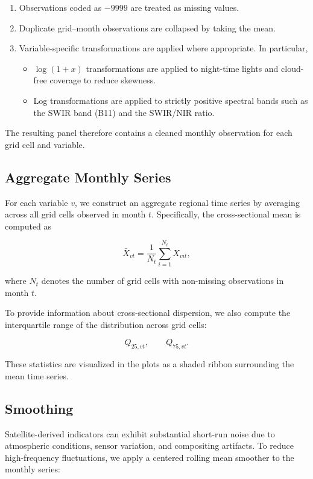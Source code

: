\documentclass[12pt]{article}
\begin{document}
\begin{enumerate}
    \item Observations coded as $-9999$ are treated as missing values.
    \item Duplicate grid--month observations are collapsed by taking the mean.
    \item Variable-specific transformations are applied where appropriate. In particular,
    \begin{itemize}
        \item $\log(1 + x)$ transformations are applied to night-time lights and cloud-free coverage to reduce skewness.
        \item Log transformations are applied to strictly positive spectral bands such as the SWIR band (B11) and the SWIR/NIR ratio.
    \end{itemize}
\end{enumerate}

The resulting panel therefore contains a cleaned monthly observation for each grid cell and variable.

\subsection{Aggregate Monthly Series}

For each variable $v$, we construct an aggregate regional time series by averaging across all grid cells observed in month $t$. Specifically, the cross-sectional mean is computed as

\[
\bar{X}_{vt} =
\frac{1}{N_t}
\sum_{i=1}^{N_t} X_{vit},
\]

where $N_t$ denotes the number of grid cells with non-missing observations in month $t$.

To provide information about cross-sectional dispersion, we also compute the interquartile range of the distribution across grid cells:

\[
Q_{25,vt}, \qquad Q_{75,vt}.
\]

These statistics are visualized in the plots as a shaded ribbon surrounding the mean time series.

\subsection{Smoothing}

Satellite-derived indicators can exhibit substantial short-run noise due to atmospheric conditions, sensor variation, and compositing artifacts. To reduce high-frequency fluctuations, we apply a centered rolling mean smoother to the monthly series:
\end{document}
